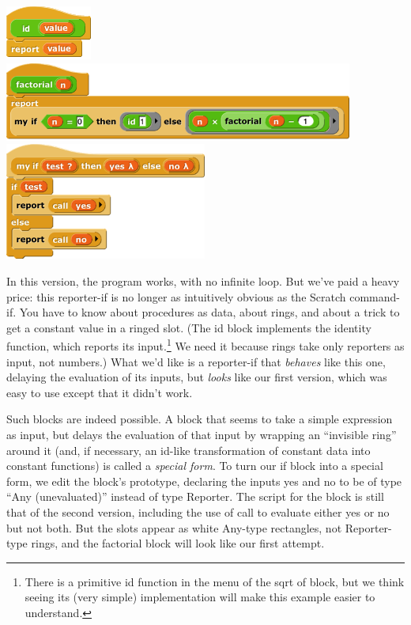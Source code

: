 \includegraphics[width=1.11458in,height=0.69792in]{media/image740.png}\includegraphics[width=4.52083in,height=1.02292in]{media/image741.png}\includegraphics[width=2.61736in,height=1.51042in]{media/image742.png}

In this version, the program works, with no infinite loop. But we've
paid a heavy price: this reporter-if is no longer as intuitively obvious
as the Scratch command-if. You have to know about procedures as data,
about rings, and about a trick to get a constant value in a ringed slot.
(The id block implements the identity function, which reports its
input.\footnote{There is a primitive id function in the menu of the sqrt
  of block, but we think seeing its (very simple) implementation will
  make this example easier to understand.} We need it because rings take
only reporters as input, not numbers.) What we'd like is a reporter-if
that \emph{behaves} like this one, delaying the evaluation of its
inputs, but \emph{looks} like our ﬁrst version, which was easy to use
except that it didn't work.

Such blocks are indeed possible. A block that seems to take a simple
expression as input, but delays the evaluation of that input by wrapping
an ``invisible ring'' around it (and, if necessary, an id-like
transformation of constant data into constant functions) is called a
\emph{special form}. To turn our if block into a special form, we edit
the block's prototype, declaring the inputs yes and no to be of type
``Any (unevaluated)'' instead of type Reporter. The script for the block
is still that of the second version, including the use of call to
evaluate either yes or no but not both. But the slots appear as white
Any-type rectangles, not Reporter-type rings, and the factorial block
will look like our ﬁrst attempt.

